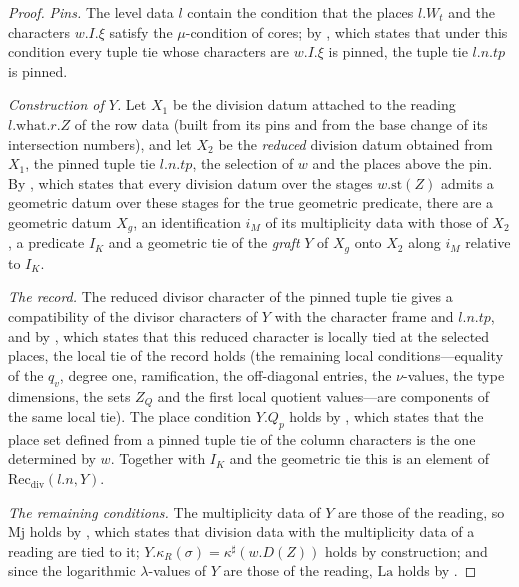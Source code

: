 \begin{proof}
\emph{Pins.} The level data $l$ contain the condition that the places $l.W_t$ and the characters $w.I.\xi$ satisfy the
$\mu$-condition of cores; by , which states that under this
condition every tuple tie whose characters are $w.I.\xi$ is pinned, the tuple tie $l.n.tp$ is pinned.

\emph{Construction of $Y$.} Let $X_1$ be the division datum attached to the reading $l.\mathrm{what}.r.Z$ of the row
data (built from its pins and from the base change of its intersection numbers), and let $X_2$ be the \emph{reduced}
division datum obtained from $X_1$, the pinned tuple tie $l.n.tp$, the selection of $w$ and the places above the
pin. By , which states that every division datum over the
stages $w.\mathrm{st}(Z)$ admits a geometric datum over these stages for the true geometric predicate, there are a
geometric datum $X_g$, an identification $i_M$ of its multiplicity data with those of $X_2$, a predicate
$I_K$ and a geometric tie of the \emph{graft} $Y$ of $X_g$ onto $X_2$ along $i_M$ relative to $I_K$.

\emph{The record.} The reduced divisor character of the pinned tuple tie gives a compatibility of the divisor
characters of $Y$ with the character frame and $l.n.tp$, and by , which
states that this reduced character is locally tied at the selected places, the local tie of the record holds (the
remaining local conditions---equality of the $q_v$, degree one, ramification, the off-diagonal entries, the
$\nu$-values, the type dimensions, the sets $Z_Q$ and the first local quotient values---are components of the same
local tie). The place condition $Y.Q_p$ holds by , which states
that the place set defined from a pinned tuple tie of the column characters is the one determined by $w$. Together
with $I_K$ and the geometric tie this is an element of $\mathrm{Rec}_{\mathrm{div}}(l.n,Y)$.

\emph{The remaining conditions.} The multiplicity data of $Y$ are those of the reading, so $\mathrm{Mj}$ holds by
, which states that division data with the multiplicity data of a reading
are tied to it; $Y.\kappa_R(\sigma)=\kappa^\sharp(w.D(Z))$ holds by construction; and since the logarithmic
$\lambda$-values of $Y$ are those of the reading, $\mathrm{La}$ holds by
.
\end{proof}

